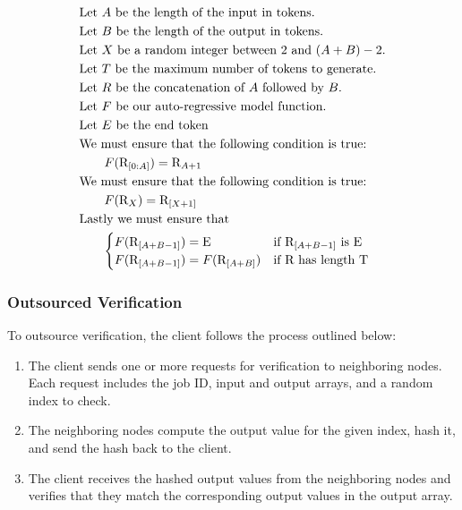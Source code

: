\documentclass{article}
\begin{document}
\begin{align*}
    \begin{aligned}
        &\text{Let }A\text{ be the length of the input in tokens.}\\
        &\text{Let }B\text{ be the length of the output in tokens.}\\
        &\text{Let } X \text{ be a random integer between 2 and } (A + B) - 2. \\
        &\text{Let }T\text{ be the maximum number of tokens to generate.}\\
        &\text{Let }R\text{ be the concatenation of }A\text{ followed by }B.\\
        &\text{Let }F\text{ be our auto-regressive model function.}\\
        &\text{Let }E\text{ be the end token}\\
        &\text{We must ensure that the following condition is true:}\\
        &\qquad F(\text{R}_{[0:A]}) = \text{R}_{A+1} \\
        &\text{We must ensure that the following condition is true:} \\
        &\qquad F(\text{R}_X) = \text{R}_{[X+1]} \\
        &\text{Lastly we must ensure that} \\
        &\qquad \begin{aligned}
        \begin{cases}
            F(\text{R}_{[A+B-1]}) = \text{E} & \text{if } \text{R}_{[A+B-1]} \text{ is }  $E$ \\
            F(\text{R}_{[A+B-1]}) = F(\text{R}_{[A+B]}) & \text{if } \text{R} \text{ has length } \text{T}
        \end{cases}
        \end{aligned}
    \end{aligned}
\end{align*}

\subsubsection{Outsourced Verification}
To outsource verification, the client follows the process outlined below:
\begin{enumerate}
\item The client sends one or more requests for verification to neighboring nodes. Each request includes the job ID, input and output arrays, and a random index to check.
\item The neighboring nodes compute the output value for the given index, hash it, and send the hash back to the client.
\item The client receives the hashed output values from the neighboring nodes and verifies that they match the corresponding output values in the output array.
\end{enumerate}
\end{document}
